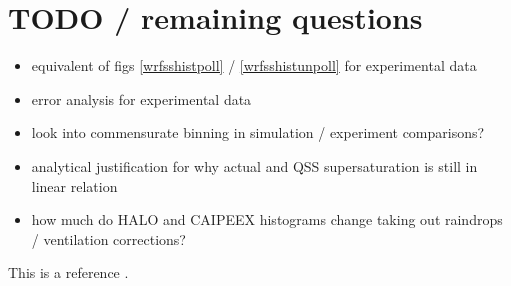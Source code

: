 \documentclass{article}
\begin{document}
\section{TODO / remaining questions}
\begin{itemize}
	\item equivalent of figs \ref{wrfsshistpoll} / \ref{wrfsshistunpoll} for experimental data
	\item error analysis for experimental data
	\item look into commensurate binning in simulation / experiment comparisons?
	\item analytical justification for why actual and QSS supersaturation is still in linear relation
	\item how much do HALO and CAIPEEX histograms change taking out raindrops / ventilation corrections?
\end{itemize}
This is a reference \cite{Fan2018}.



\end{document}
